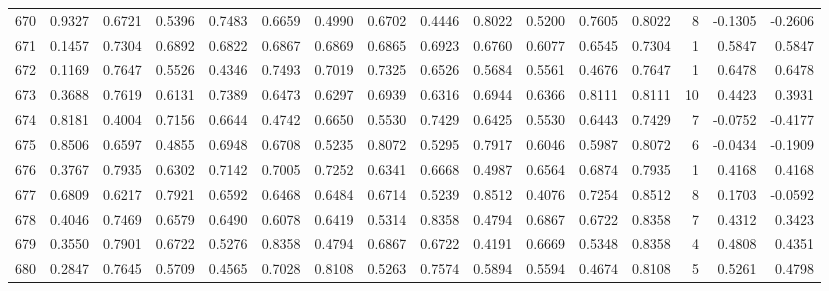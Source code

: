 \begin{tabular}{lrrrrrrrrrrrrrrr}
670 &      0.9327 &  0.6721 &  0.5396 &  0.7483 &  0.6659 &  0.4990 &  0.6702 &  0.4446 &  0.8022 &  0.5200 &   0.7605 &     0.8022 &      8 &                   -0.1305 &                    -0.2606 \\
671 &      0.1457 &  0.7304 &  0.6892 &  0.6822 &  0.6867 &  0.6869 &  0.6865 &  0.6923 &  0.6760 &  0.6077 &   0.6545 &     0.7304 &      1 &                    0.5847 &                     0.5847 \\
672 &      0.1169 &  0.7647 &  0.5526 &  0.4346 &  0.7493 &  0.7019 &  0.7325 &  0.6526 &  0.5684 &  0.5561 &   0.4676 &     0.7647 &      1 &                    0.6478 &                     0.6478 \\
673 &      0.3688 &  0.7619 &  0.6131 &  0.7389 &  0.6473 &  0.6297 &  0.6939 &  0.6316 &  0.6944 &  0.6366 &   0.8111 &     0.8111 &     10 &                    0.4423 &                     0.3931 \\
674 &      0.8181 &  0.4004 &  0.7156 &  0.6644 &  0.4742 &  0.6650 &  0.5530 &  0.7429 &  0.6425 &  0.5530 &   0.6443 &     0.7429 &      7 &                   -0.0752 &                    -0.4177 \\
675 &      0.8506 &  0.6597 &  0.4855 &  0.6948 &  0.6708 &  0.5235 &  0.8072 &  0.5295 &  0.7917 &  0.6046 &   0.5987 &     0.8072 &      6 &                   -0.0434 &                    -0.1909 \\
676 &      0.3767 &  0.7935 &  0.6302 &  0.7142 &  0.7005 &  0.7252 &  0.6341 &  0.6668 &  0.4987 &  0.6564 &   0.6874 &     0.7935 &      1 &                    0.4168 &                     0.4168 \\
677 &      0.6809 &  0.6217 &  0.7921 &  0.6592 &  0.6468 &  0.6484 &  0.6714 &  0.5239 &  0.8512 &  0.4076 &   0.7254 &     0.8512 &      8 &                    0.1703 &                    -0.0592 \\
678 &      0.4046 &  0.7469 &  0.6579 &  0.6490 &  0.6078 &  0.6419 &  0.5314 &  0.8358 &  0.4794 &  0.6867 &   0.6722 &     0.8358 &      7 &                    0.4312 &                     0.3423 \\
679 &      0.3550 &  0.7901 &  0.6722 &  0.5276 &  0.8358 &  0.4794 &  0.6867 &  0.6722 &  0.4191 &  0.6669 &   0.5348 &     0.8358 &      4 &                    0.4808 &                     0.4351 \\
680 &      0.2847 &  0.7645 &  0.5709 &  0.4565 &  0.7028 &  0.8108 &  0.5263 &  0.7574 &  0.5894 &  0.5594 &   0.4674 &     0.8108 &      5 &                    0.5261 &                     0.4798 \\

\end{tabular}
